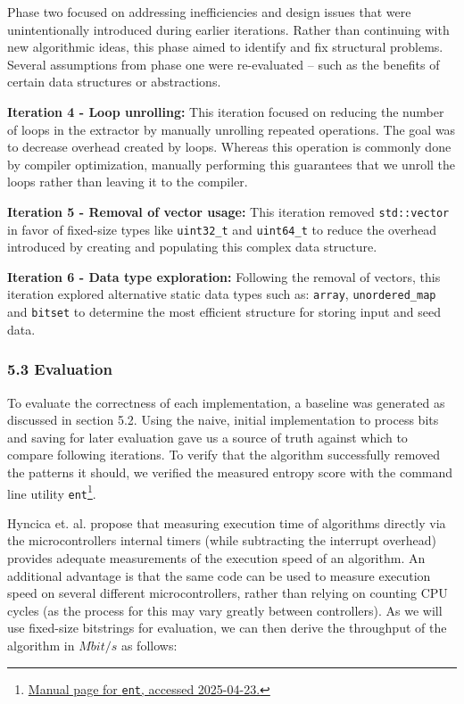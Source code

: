 \documentclass{sigchi}
\begin{document}
Phase two focused on addressing inefficiencies and design issues that were unintentionally introduced during earlier iterations. Rather than continuing with new algorithmic ideas, this phase aimed to identify and fix structural problems. Several assumptions from phase one were re-evaluated -- such as the benefits of certain data structures or abstractions.

\textbf{Iteration 4 - Loop unrolling:} This iteration focused on reducing the number of loops in the extractor by manually unrolling repeated operations. The goal was to decrease overhead created by loops. Whereas this operation is commonly done by compiler optimization, manually performing this guarantees that we unroll the loops rather than leaving it to the compiler.

\textbf{Iteration 5 - Removal of vector usage:} This iteration removed \texttt{std::vector} in favor of fixed-size types like \texttt{uint32\_t} and \texttt{uint64\_t} to reduce the overhead introduced by creating and populating this complex data structure.

\textbf{Iteration 6 - Data type exploration:} Following the removal of vectors, this iteration explored alternative static data types such as: \texttt{array}, \texttt{unordered\_map} and \texttt{bitset} to determine the most efficient structure for storing input and seed data.

\subsubsection{5.3 Evaluation}\label{evaluation}

To evaluate the correctness of each implementation, a baseline was generated as discussed in section 5.2. Using the naive, initial implementation to process bits and saving for later evaluation gave us a source of truth against which to compare following iterations. To verify that the algorithm successfully removed the patterns it should, we verified the measured entropy score with the command line utility \texttt{ent}\footnote{\href{https://manpages.ubuntu.com/manpages/trusty/man1/ent.1.html}{Manual page for \texttt{ent}, accessed 2025-04-23.}}.

Hyncica et. al. \cite{micromeasurements} propose that measuring execution time of algorithms directly via the microcontrollers internal timers (while subtracting the interrupt overhead) provides adequate measurements of the execution speed of an algorithm. An additional advantage is that the same code can be used to measure execution speed on several different microcontrollers, rather than relying on counting CPU cycles (as the process for this may vary greatly between controllers). As we will use fixed-size bitstrings for evaluation, we can then derive the throughput of the algorithm in \(Mbit/s\) as follows:
\end{document}
